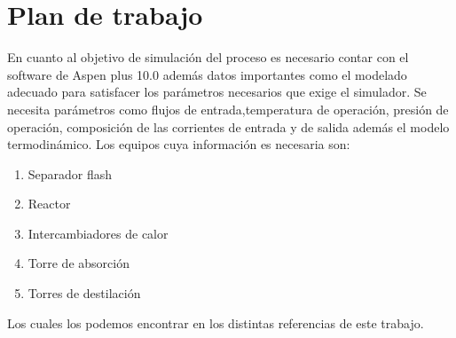 \section*{Plan de trabajo}
    En cuanto al objetivo de  simulación del proceso es necesario  contar  con el software de Aspen  plus 10.0 además datos importantes como el modelado adecuado para satisfacer los parámetros necesarios que exige el simulador. Se necesita parámetros como flujos de entrada,temperatura de operación, presión de operación, composición de las corrientes de entrada y de salida además el modelo termodinámico. Los equipos cuya información es necesaria son:\\

        \begin{enumerate}
            \item Separador flash
            \item Reactor
            \item Intercambiadores de calor
            \item Torre de absorción
            \item Torres de destilación
        \end{enumerate}

    Los cuales los podemos encontrar en los distintas referencias de este trabajo.

